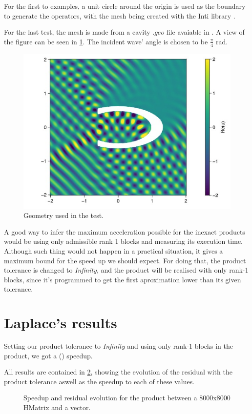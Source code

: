 For the first to examples, a unit circle around the origin is used as the boundary to generate the operators, with the mesh being created with the Inti library \cite{git-inti}.

For the last test, the mesh is made from a cavity $.geo$ file avaiable in \cite{git_dudu}. A view of the figure can be seen in \ref{fig:cavity_fig}. The incident wave' angle is chosen to be $\frac{\pi}{4}$ rad.

\begin{figure}[h!]
    \centering
    \includegraphics[width=0.6\linewidth]{images/cavity_fig.jpg}
    \caption{Geometry used in the test.}
    \label{fig:cavity_fig}
\end{figure}

A good way to infer the maximum acceleration possible for the inexact products would be using only admissible rank 1 blocks and measuring its execution time. Although such thing would not happen in a practical situation, it gives a maximum bound for the speed up we should expect.
For doing that, the product tolerance is changed to \textit{Infinity}, and the product will be realised with only rank-1 blocks, since it's programmed to get the first aproximation lower than its given tolerance.

\section{Laplace's results}

Setting our product tolerance to \textit{Infinity} and using only rank-1 blocks in the product, we got a () speedup.

All results are contained in \ref{fig:laplace_results}, showing the evolution of the residual with the product tolerance aswell as the speedup to each of these values.

\begin{figure}[h!]
    \centering
    
    \caption{Speedup and residual evolution for the product between a 8000x8000 HMatrix and a vector.}
    \label{fig:laplace_results}
\end{figure}

